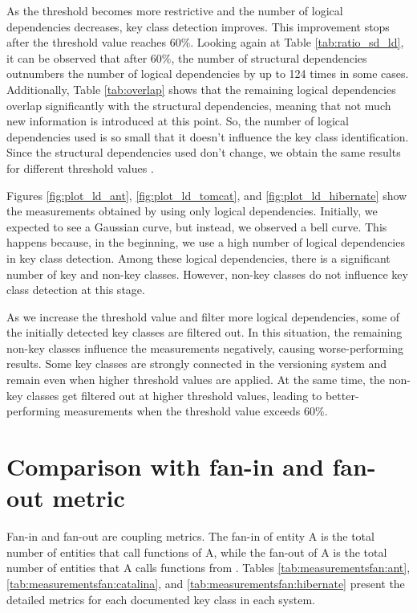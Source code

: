 As the threshold becomes more restrictive and the number of logical dependencies decreases, key class detection improves. This improvement stops after the threshold value reaches 60\%. Looking again at Table \ref{tab:ratio_sd_ld}, it can be observed that after 60\%, the number of structural dependencies outnumbers the number of logical dependencies by up to 124 times in some cases. Additionally, Table \ref{tab:overlap} shows that the remaining logical dependencies overlap significantly with the structural dependencies, meaning that not much new information is introduced at this point.
 So, the number of logical dependencies used is so small that it doesn't influence the key class identification. Since the structural dependencies used don't change, we obtain the same results for different threshold values \hspace{4em}. 



Figures \ref{fig:plot_ld_ant}, \ref{fig:plot_ld_tomcat}, and \ref{fig:plot_ld_hibernate} show the measurements obtained by using only logical dependencies. Initially, we expected to see a Gaussian curve, but instead, we observed a bell curve. This happens because, in the beginning, we use a high number of logical dependencies in key class detection. Among these logical dependencies, there is a significant number of key and non-key classes. However, non-key classes do not influence key class detection at this stage.

As we increase the threshold value and filter more logical dependencies, some of the initially detected key classes are filtered out. In this situation, the remaining non-key classes influence the measurements negatively, causing worse-performing results. Some key classes are strongly connected in the versioning system and remain even when higher threshold values are applied. At the same time, the non-key classes get filtered out at higher threshold values, leading to better-performing measurements when the threshold value exceeds 60\%.




\section{Comparison with fan-in and fan-out metric}
\label{sec:key_metrics}


\hspace{4em}Fan-in and fan-out are coupling metrics. The fan-in of entity A is the total number of entities that call functions of A, while the fan-out of A is the total number of entities that A calls functions from \cite{5507329}. Tables \ref{tab:measurementsfan:ant}, \ref{tab:measurementsfan:catalina}, and \ref{tab:measurementsfan:hibernate} present the detailed metrics for each documented key class in each system. 


